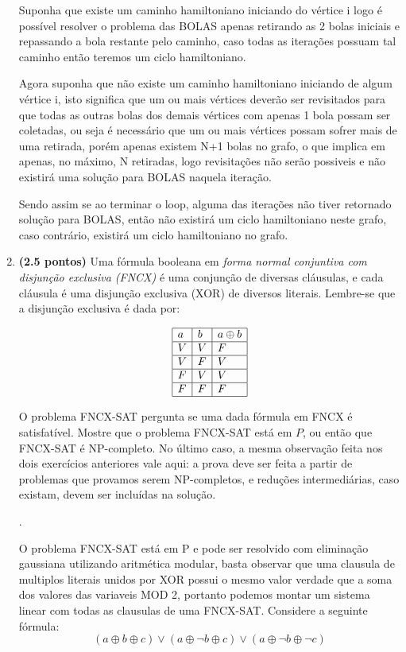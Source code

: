 \documentclass[12pt]{article}
\newcommand{\resposta}[1]{ \noindent {\bf Solução}.{\color{blue} #1}}
\begin{document}
\begin{enumerate}
{\begin{enumerate}
    Suponha que existe um caminho hamiltoniano iniciando do vértice i logo é possível resolver o problema das BOLAS apenas retirando as 2 bolas iniciais e repassando a bola restante pelo caminho, caso todas as iterações possuam tal caminho então teremos um ciclo hamiltoniano. 
    
    Agora suponha que não existe um caminho hamiltoniano iniciando de algum vértice i, isto significa que um ou mais vértices deverão ser revisitados para que todas as outras bolas dos demais vértices com apenas 1 bola possam ser coletadas, ou seja é necessário que um ou mais vértices possam sofrer mais de uma retirada, porém apenas existem N+1 bolas no grafo, o que implica em apenas, no máximo, N retiradas, logo revisitações não serão possiveis e não existirá uma solução para BOLAS naquela iteração. 
    
    Sendo assim se ao terminar o loop, alguma das iterações não tiver retornado solução para BOLAS, então não existirá um ciclo hamiltoniano neste grafo, caso contrário, existirá um ciclo hamiltoniano no grafo.
    
    \end{enumerate}

}
  
\item {\bf (2.5 pontos)} Uma fórmula booleana em {\it forma normal conjuntiva com disjunção exclusiva (FNCX)} é uma conjunção de diversas cláusulas, e cada cláusula é uma disjunção exclusiva (XOR) de diversos literais. Lembre-se que a disjunção exclusiva é dada por:

  $$\begin{array}{|l|l|l|}\hline
      a & b & a \oplus b \\ \hline
      V & V & F \\ \hline
      V & F & V \\ \hline
      F & V & V \\ \hline
      F & F & F \\ \hline
  \end{array}$$

  O problema FNCX-SAT pergunta se uma dada fórmula em FNCX é
  satisfatível. Mostre que o problema FNCX-SAT está em $P$, ou então
  que FNCX-SAT é NP-completo. No último caso, a mesma observação feita
  nos dois exercícios anteriores vale aqui: a prova deve ser feita a
  partir de problemas que provamos serem NP-completos, e reduções
  intermediárias, caso existam, devem ser incluídas na solução.

  \resposta{
     O problema FNCX-SAT está em P e pode ser resolvido com eliminação gaussiana utilizando aritmética modular, basta observar que uma clausula de multiplos literais unidos por XOR possui o mesmo valor verdade que a soma dos valores das variaveis MOD 2, portanto podemos montar um sistema linear com todas as clausulas de uma FNCX-SAT.
    Considere a seguinte fórmula:
        \[ (a \oplus b \oplus c) \lor
        (a \oplus \neg b \oplus c) \lor
        (a \oplus \neg b \oplus \neg c) \]
    
}
\end{enumerate}
\end{document}
